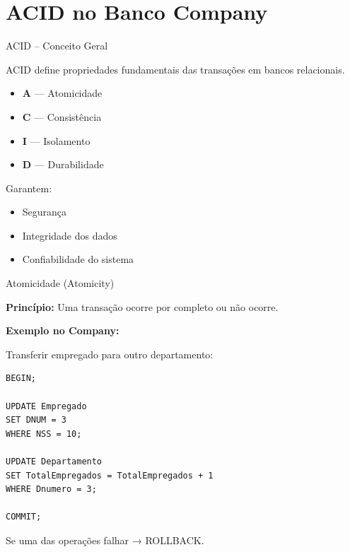 \documentclass{beamer}
\begin{document}
\section{ACID no Banco Company}





\begin{frame}{ACID – Conceito Geral}

ACID define propriedades fundamentais das transações em bancos relacionais.

\begin{itemize}
    \item \textbf{A} — Atomicidade
    \item \textbf{C} — Consistência
    \item \textbf{I} — Isolamento
    \item \textbf{D} — Durabilidade
\end{itemize}

Garantem:
\begin{itemize}
    \item Segurança
    \item Integridade dos dados
    \item Confiabilidade do sistema
\end{itemize}

\end{frame}






\begin{frame}[fragile]{Atomicidade (Atomicity)}

\textbf{Princípio:}
Uma transação ocorre por completo ou não ocorre.

\textbf{Exemplo no Company:}

Transferir empregado para outro departamento:

\begin{verbatim}
BEGIN;

UPDATE Empregado
SET DNUM = 3
WHERE NSS = 10;

UPDATE Departamento
SET TotalEmpregados = TotalEmpregados + 1
WHERE Dnumero = 3;

COMMIT;
\end{verbatim}

Se uma das operações falhar → ROLLBACK.

\end{frame}
\end{document}
